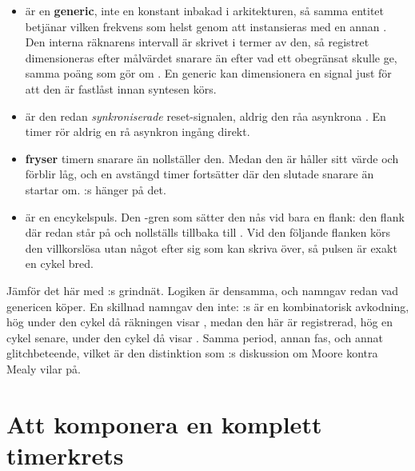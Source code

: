 \begin{itemize}
  \item {} är en \textbf{generic}, inte en konstant inbakad i arkitekturen, så samma
    entitet betjänar vilken frekvens som helst genom att instansieras med en annan
    . Den interna räknarens intervall är skrivet i termer av den, så registret
    dimensioneras efter målvärdet snarare än efter vad ett obegränsat  skulle ge,
    samma poäng som  gör om . En generic kan
    dimensionera en signal just för att den är fastlåst innan syntesen körs.
  \item {} är den redan \emph{synkroniserade} reset-signalen, aldrig den råa
    asynkrona . En timer rör aldrig en rå asynkron ingång direkt.
  \item {} \textbf{fryser} timern snarare än nollställer den. Medan den är 
    håller  sitt värde och  förblir låg, och en avstängd timer
    fortsätter där den slutade snarare än startar om. :s  hänger på
    det.
  \item {} är en encykelspuls. Den -gren som sätter den nås vid bara en
    flank: den flank där  redan står på  och nollställs tillbaka till
    . Vid den följande flanken körs den villkorslösa  utan något efter
    sig som kan skriva över, så pulsen är exakt en cykel bred.
\end{itemize}

Jämför det här med :s grindnät. Logiken är densamma, och
 namngav redan vad genericen köper. En skillnad namngav den inte:
:s  är en kombinatorisk avkodning, hög under den cykel då
räkningen visar , medan den här är registrerad, hög en cykel senare, under den cykel då
 visar . Samma period, annan fas, och annat glitchbeteende, vilket är den
distinktion som :s diskussion om Moore kontra Mealy vilar på.

\section{Att komponera en komplett timerkrets}
\label{c7:sec:compose}

